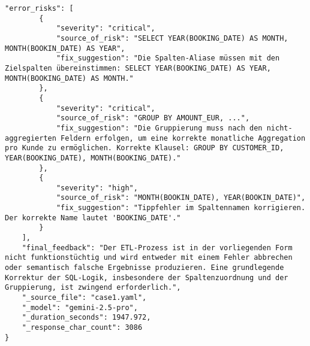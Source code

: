 \begin{lstlisting}[caption={Ausgabe: Gemini 2.5 Pro Anwendungsfall 1 Konsistenzdurchlauf},label={gemini_case1_prompt2}]
    "error_risks": [
        {
            "severity": "critical",
            "source_of_risk": "SELECT YEAR(BOOKING_DATE) AS MONTH, MONTH(BOOKIN_DATE) AS YEAR",
            "fix_suggestion": "Die Spalten-Aliase müssen mit den Zielspalten übereinstimmen: SELECT YEAR(BOOKING_DATE) AS YEAR, MONTH(BOOKING_DATE) AS MONTH."
        },
        {
            "severity": "critical",
            "source_of_risk": "GROUP BY AMOUNT_EUR, ...",
            "fix_suggestion": "Die Gruppierung muss nach den nicht-aggregierten Feldern erfolgen, um eine korrekte monatliche Aggregation pro Kunde zu ermöglichen. Korrekte Klausel: GROUP BY CUSTOMER_ID, YEAR(BOOKING_DATE), MONTH(BOOKING_DATE)."
        },
        {
            "severity": "high",
            "source_of_risk": "MONTH(BOOKIN_DATE), YEAR(BOOKIN_DATE)",
            "fix_suggestion": "Tippfehler im Spaltennamen korrigieren. Der korrekte Name lautet 'BOOKING_DATE'."
        }
    ],
    "final_feedback": "Der ETL-Prozess ist in der vorliegenden Form nicht funktionstüchtig und wird entweder mit einem Fehler abbrechen oder semantisch falsche Ergebnisse produzieren. Eine grundlegende Korrektur der SQL-Logik, insbesondere der Spaltenzuordnung und der Gruppierung, ist zwingend erforderlich.",
    "_source_file": "case1.yaml",
    "_model": "gemini-2.5-pro",
    "_duration_seconds": 1947.972,
    "_response_char_count": 3086
}
\end{lstlisting}

